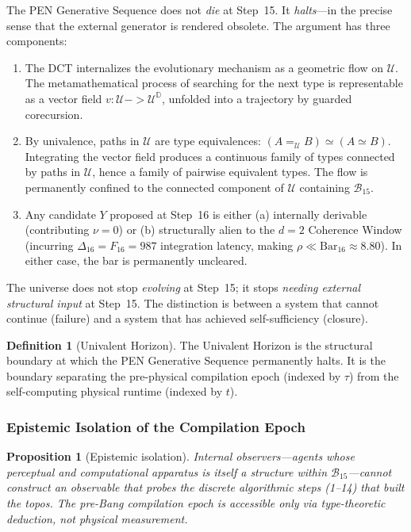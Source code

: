 \documentclass[11pt,a4paper]{article}
\def\to{->}%
\theoremstyle{plain}
\newtheorem{proposition}[theorem]{Proposition}
\theoremstyle{definition}
\newtheorem{definition}[theorem]{Definition}
\theoremstyle{remark}
\newcommand{\D}{\mathbb{D}}
\newcommand{\U}{\mathcal{U}}
\newcommand{\B}{\mathcal{B}}
\begin{document}
The PEN Generative Sequence does not \emph{die} at Step~15.  It \emph{halts}---in the precise sense that the external generator is rendered obsolete.  The argument has three components:

\begin{enumerate}[nosep]
    \item The DCT internalizes the evolutionary mechanism as a geometric flow on $\U$.  The metamathematical process of searching for the next type is representable as a vector field $v : \U \to \U^{\D}$, unfolded into a trajectory by guarded corecursion.
    \item By univalence, paths in $\U$ are type equivalences: $(A =_{\U} B) \simeq (A \simeq B)$.  Integrating the vector field produces a continuous family of types connected by paths in $\U$, hence a family of pairwise equivalent types.  The flow is permanently confined to the connected component of $\U$ containing $\B_{15}$.
    \item Any candidate $Y$ proposed at Step~16 is either (a) internally derivable (contributing $\nu = 0$) or (b) structurally alien to the $d = 2$ Coherence Window (incurring $\Delta_{16} = F_{16} = 987$ integration latency, making $\rho \ll \mathrm{Bar}_{16} \approx 8.80$).  In either case, the bar is permanently uncleared.
\end{enumerate}

The universe does not stop \emph{evolving} at Step~15; it stops \emph{needing external structural input} at Step~15.  The distinction is between a system that cannot continue (failure) and a system that has achieved self-sufficiency (closure).

\begin{definition}[Univalent Horizon]
\label{def:horizon}
The Univalent Horizon is the structural boundary at which the PEN Generative Sequence permanently halts.  It is the boundary separating the pre-physical compilation epoch (indexed by $\tau$) from the self-computing physical runtime (indexed by $t$).
\end{definition}


\subsubsection{Epistemic Isolation of the Compilation Epoch}

\begin{proposition}[Epistemic isolation]
\label{prop:epistemic}
Internal observers---agents whose perceptual and computational apparatus is itself a structure within $\B_{15}$---cannot construct an observable that probes the discrete algorithmic steps (1--14) that built the topos.  The pre-Bang compilation epoch is accessible only via type-theoretic deduction, not physical measurement.
\end{proposition}
\end{document}
